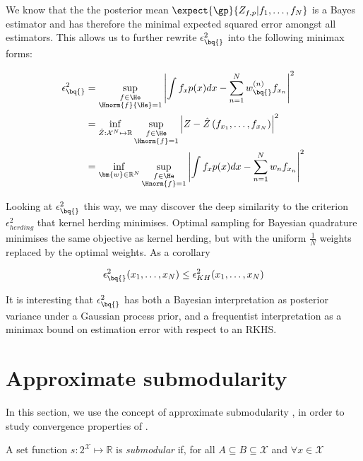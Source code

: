 We know that the the posterior mean $\expect{\gp}{Z_{f,p}\vert f_1,\ldots,f_N}$ is a Bayes estimator and has therefore the minimal expected squared error amongst all estimators. This allows us to further rewrite $\epsilon^{2}_{\bq{}}$ into the following minimax forms:

\begin{align}
\epsilon^{2}_{\bq{}} &= \sup_{\substack{f\in\He\\\Hnorm{f}{\He}=1}} \left| \int f_x p(x) dx - \sum_{n=1}^{N}w^{(n)}_{\bq{}} f_{x_n}\right|^2\\
	&= \inf_{\hat{Z}:\mathcal{X}^N\mapsto\mathbb{R}} \sup_{\substack{f\in\He\\\Hnorm{f}=1}} \left| Z - \hat{Z}\left(f_{x_1},\ldots,f_{x_N}\right)\right|^2\\
	&= \inf_{\bm{w}\in\mathbb{R}^N} \sup_{\substack{f\in\He\\\Hnorm{f}=1}} \left| \int f_x p(x) dx - \sum_{n=1}^{N}w_n  f_{x_n}\right|^2
\end{align}

Looking at $\epsilon^{2}_{\bq{}}$  this way, we may discover the deep similarity to the criterion $\epsilon^2_{herding}$ that kernel herding minimises. Optimal sampling for Bayesian quadrature minimises the same objective as kernel herding, but with the uniform $\frac{1}{N}$ weights replaced by the optimal weights. As a corollary

\begin{align}
	\epsilon^{2}_{\bq{}}(x_1,\ldots,x_N)  \leq \epsilon^{2}_{KH} (x_1,\ldots,x_N)
\end{align}

It is interesting that $\epsilon^{2}_{\bq{}}$ has both a Bayesian interpretation as posterior variance under a Gaussian process prior, and a frequentist interpretation as a minimax bound on estimation error with respect to an RKHS.

\section{Approximate submodularity\label{sec:herding_submodularity}}

In this section, we use the concept of approximate submodularity \citep{KrauseCevher10}, in order to study convergence properties of \sbq{}.

A set function $s:2^\mathcal{X} \mapsto \mathbb{R}$ is \textit{submodular} if, for all $A\subseteq B\subseteq \mathcal{X}$ and $\forall x \in \mathcal{X}$

